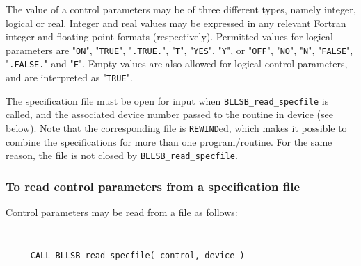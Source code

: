 \documentclass{galahad}
\newcommand{\packagename}{BLLSB}
\begin{document}
The value of a control parameters may be of three different types, namely
integer, logical or real.
Integer and real values may be expressed in any relevant Fortran integer and
floating-point formats (respectively). Permitted values for logical
parameters are "{\tt ON}", "{\tt TRUE}", "{\tt .TRUE.}", "{\tt T}",
"{\tt YES}", "{\tt Y}", or "{\tt OFF}", "{\tt NO}",
"{\tt N}", "{\tt FALSE}", "{\tt .FALSE.}" and "{\tt F}".
Empty values are also allowed for
logical control parameters, and are interpreted as "{\tt TRUE}".

The specification file must be open for
input when {\tt \packagename\_read\_specfile}
is called, and the associated device number
passed to the routine in device (see below).
Note that the corresponding
file is {\tt REWIND}ed, which makes it possible to combine the specifications
for more than one program/routine.  For the same reason, the file is not
closed by {\tt \packagename\_read\_specfile}.

\subsubsection{To read control parameters from a specification file}
\label{readspec}

Control parameters may be read from a file as follows:
\hskip0.5in

\def\baselinestretch{0.8}
{\tt
\begin{verbatim}
     CALL BLLSB_read_specfile( control, device )
\end{verbatim}
}
\def\baselinestretch{1.0}
\end{document}
